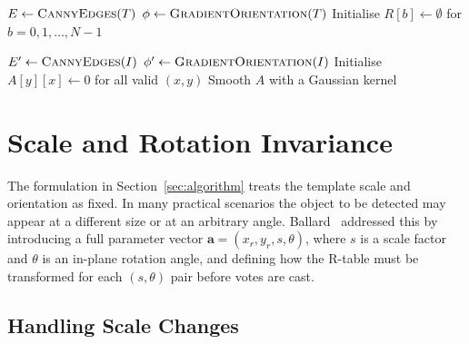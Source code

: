 \documentclass[12pt,a4paper]{article}
\begin{document}
\begin{algorithm}[H]
\DontPrintSemicolon
\caption{GHT --- Training Phase}
\label{alg:train}
$E \leftarrow \textsc{CannyEdges}(T)$\;
$\phi \leftarrow \textsc{GradientOrientation}(T)$\;
Initialise $R[b] \leftarrow \emptyset$ for $b = 0, 1, \ldots, N{-}1$\;
\end{algorithm}

\vspace{1em}

\begin{algorithm}[H]
\DontPrintSemicolon
\caption{GHT --- Detection Phase}
\label{alg:detect}
$E' \leftarrow \textsc{CannyEdges}(I)$\;
$\phi' \leftarrow \textsc{GradientOrientation}(I)$\;
Initialise $A[y][x] \leftarrow 0$ for all valid $(x, y)$\;
Smooth $A$ with a Gaussian kernel\;
\end{algorithm}

\section{Scale and Rotation Invariance}
\label{sec:scale_rotation}

The formulation in Section~\ref{sec:algorithm} treats the template scale and
orientation as fixed.  In many practical scenarios the object to be detected may
appear at a different size or at an arbitrary angle.  Ballard~\cite{ballard1981}
addressed this by introducing a full parameter vector
$\mathbf{a} = (x_r, y_r, s, \theta)$, where $s$ is a scale factor and $\theta$ is
an in-plane rotation angle, and defining how the R-table must be transformed for each
$(s, \theta)$ pair before votes are cast.

\subsection{Handling Scale Changes}
\end{document}
